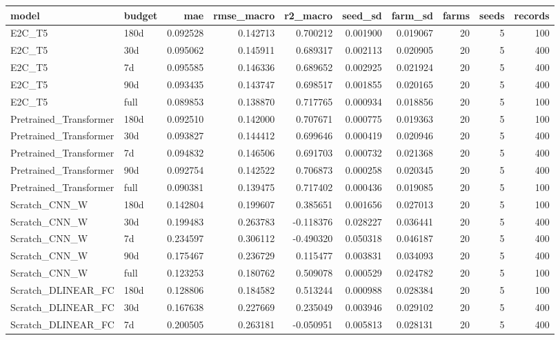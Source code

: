 \begin{tabular}{llrrrrrrrr}
\toprule
model & budget & mae & rmse\_macro & r2\_macro & seed\_sd & farm\_sd & farms & seeds & records \\
\midrule
E2C\_T5 & 180d & 0.092528 & 0.142713 & 0.700212 & 0.001900 & 0.019067 & 20 & 5 & 100 \\
E2C\_T5 & 30d & 0.095062 & 0.145911 & 0.689317 & 0.002113 & 0.020905 & 20 & 5 & 400 \\
E2C\_T5 & 7d & 0.095585 & 0.146336 & 0.689652 & 0.002925 & 0.021924 & 20 & 5 & 400 \\
E2C\_T5 & 90d & 0.093435 & 0.143747 & 0.698517 & 0.001855 & 0.020165 & 20 & 5 & 400 \\
E2C\_T5 & full & 0.089853 & 0.138870 & 0.717765 & 0.000934 & 0.018856 & 20 & 5 & 100 \\
Pretrained\_Transformer & 180d & 0.092510 & 0.142000 & 0.707671 & 0.000775 & 0.019363 & 20 & 5 & 100 \\
Pretrained\_Transformer & 30d & 0.093827 & 0.144412 & 0.699646 & 0.000419 & 0.020946 & 20 & 5 & 400 \\
Pretrained\_Transformer & 7d & 0.094832 & 0.146506 & 0.691703 & 0.000732 & 0.021368 & 20 & 5 & 400 \\
Pretrained\_Transformer & 90d & 0.092754 & 0.142522 & 0.706873 & 0.000258 & 0.020345 & 20 & 5 & 400 \\
Pretrained\_Transformer & full & 0.090381 & 0.139475 & 0.717402 & 0.000436 & 0.019085 & 20 & 5 & 100 \\
Scratch\_CNN\_W & 180d & 0.142804 & 0.199607 & 0.385651 & 0.001656 & 0.027013 & 20 & 5 & 100 \\
Scratch\_CNN\_W & 30d & 0.199483 & 0.263783 & -0.118376 & 0.028227 & 0.036441 & 20 & 5 & 400 \\
Scratch\_CNN\_W & 7d & 0.234597 & 0.306112 & -0.490320 & 0.050318 & 0.046187 & 20 & 5 & 400 \\
Scratch\_CNN\_W & 90d & 0.175467 & 0.236729 & 0.115477 & 0.003831 & 0.034093 & 20 & 5 & 400 \\
Scratch\_CNN\_W & full & 0.123253 & 0.180762 & 0.509078 & 0.000529 & 0.024782 & 20 & 5 & 100 \\
Scratch\_DLINEAR\_FC & 180d & 0.128806 & 0.184582 & 0.513244 & 0.000988 & 0.028384 & 20 & 5 & 100 \\
Scratch\_DLINEAR\_FC & 30d & 0.167638 & 0.227669 & 0.235049 & 0.003946 & 0.029102 & 20 & 5 & 400 \\
Scratch\_DLINEAR\_FC & 7d & 0.200505 & 0.263181 & -0.050951 & 0.005813 & 0.028131 & 20 & 5 & 400 \\

\end{tabular}
